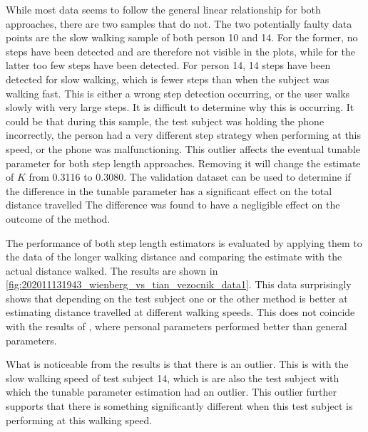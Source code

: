 While most data seems to follow the general linear relationship for both approaches, there are two samples that do not. The two potentially faulty data points are the slow walking sample of both person 10 and 14. For the former, no steps have been detected and are therefore not visible in the plots, while for the latter too few steps have been detected. For person 14, 14 steps have been detected for slow walking, which is fewer steps than when the subject was walking fast. This is either a wrong step detection occurring, or the user walks slowly with very large steps. It is difficult to determine why this is occurring. It could be that during this sample, the test subject was holding the phone incorrectly, the person had a very different step strategy when performing at this speed, or the phone was malfunctioning. This outlier affects the eventual tunable parameter for both step length approaches. Removing it will change the estimate of $K$ from 0.3116 to 0.3080. The validation dataset can be used to determine if the difference in the tunable parameter has a significant effect on the total distance travelled The difference was found to have a negligible effect on the outcome of the method.

The performance of both step length estimators is evaluated by applying them to the data of the longer walking distance and comparing the estimate with the actual distance walked. The results are shown in  \cref{fig:202011131943_wienberg_vs_tian_vezocnik_data1}. This data surprisingly shows that depending on the test subject one or the other method is better at estimating distance travelled at different walking speeds. This does not coincide with the results of \cite{Vezocnik2019}, where personal parameters performed better than general parameters.

What is noticeable from the results is that there is an outlier. This is with the slow walking speed of test subject 14, which is are also the test subject with which the tunable parameter estimation had an outlier. This outlier further supports that there is something significantly different when this test subject is performing at this walking speed.\par 

